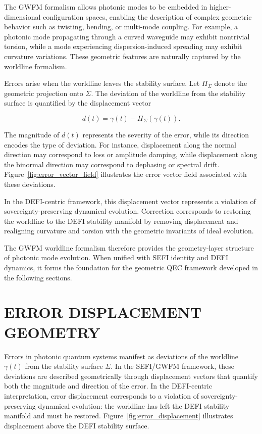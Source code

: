 \documentclass[aip,adv,reprint,floatfix]{revtex4-2}
\begin{document}
The GWFM formalism allows photonic modes to be
embedded in higher-dimensional configuration spaces,
enabling the description of complex geometric behavior
such as twisting, bending, or multi-mode coupling.\cite{DuttonElectronField2026}
For example, a photonic mode propagating through a curved
waveguide may exhibit nontrivial torsion, while a mode
experiencing dispersion-induced spreading may exhibit
curvature variations. These geometric features are naturally captured by the worldline formalism.

Errors arise when the worldline leaves the stability surface. Let $\Pi_{\Sigma}$ denote the geometric projection onto $\Sigma$.
The deviation of the worldline from the stability surface
is quantified by the displacement vector


\[
d(t) = \gamma(t) - \Pi_{\Sigma}(\gamma(t)).
\]


The magnitude of $d(t)$ represents the severity of the error, while its direction encodes the type of deviation. For
instance, displacement along the normal direction may
correspond to loss or amplitude damping, while displacement along the binormal direction may correspond to
dephasing or spectral drift.\cite{DuttonElectronField2026} Figure~\ref{fig:error_vector_field}
illustrates the error vector field associated with these deviations.

In the DEFI-centric framework, this displacement vector represents a violation of sovereignty-preserving dynamical evolution.\cite{DuttonSEFI2026} Correction corresponds to restoring
the worldline to the DEFI stability manifold by removing
displacement and realigning curvature and torsion with
the geometric invariants of ideal evolution.

The GWFM worldline formalism therefore provides
the geometry-layer structure of photonic mode evolution.
When unified with SEFI identity and DEFI dynamics, it
forms the foundation for the geometric QEC framework
developed in the following sections.
\section{ERROR DISPLACEMENT GEOMETRY}

Errors in photonic quantum systems manifest as deviations of the worldline $\gamma(t)$ from the stability surface $\Sigma$.
In the SEFI/GWFM framework, these deviations are described geometrically through displacement vectors that
quantify both the magnitude and direction of the error.\cite{DuttonElectronField2026}
In the DEFI-centric interpretation, error displacement
corresponds to a violation of sovereignty-preserving dynamical evolution: the worldline has left the DEFI stability manifold and must be restored. Figure~\ref{fig:error_displacement}
illustrates displacement above the DEFI stability surface.
\end{document}
